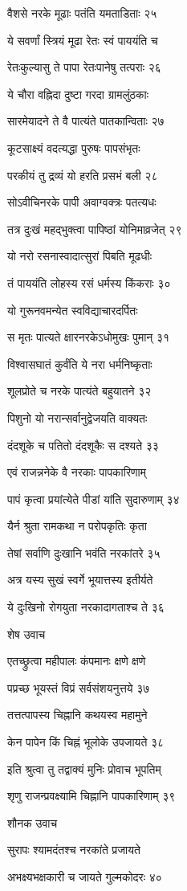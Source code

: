 वैशसे नरके मूढाः पतंति यमताडिताः २५

ये सवर्णां स्त्रियं मूढा रेतः स्वं पाययंति च

रेतःकुल्यासु ते पापा रेतःपानेषु तत्पराः २६

ये चौरा वह्निदा दुष्टा गरदा ग्रामलुंठकाः

सारमेयादने ते वै पात्यंते पातकान्विताः २७

कूटसाक्ष्यं वदत्यद्धा पुरुषः पापसंभृतः

परकीयं तु द्रव्यं यो हरति प्रसभं बली २८

सोऽवीचिनरके पापी अवाग्वक्त्रः पतत्यधः

तत्र दुःखं महद्भुक्त्वा पापिष्ठां योनिमाव्रजेत् २९

यो नरो रसनास्वादात्सुरां पिबति मूढधीः

तं पाययंति लोहस्य रसं धर्मस्य किंकराः ३०

यो गुरूनवमन्येत स्वविद्याचारदर्पितः

स मृतः पात्यते क्षारनरकेऽधोमुखः पुमान् ३१

विश्वासघातं कुर्वंति ये नरा धर्मनिष्कृताः

शूलप्रोते च नरके पात्यंते बहुयातने ३२

पिशुनो यो नरान्सर्वानुद्वेजयति वाक्यतः

दंदशूके च पतितो दंदशूकैः स दश्यते ३३

एवं राजन्ननेके वै नरकाः पापकारिणाम्

पापं कृत्वा प्रयांत्येते पीडां यांति सुदारुणाम् ३४

यैर्न श्रुता रामकथा न परोपकृतिः कृता

तेषां सर्वाणि दुःखानि भवंति नरकांतरे ३५

अत्र यस्य सुखं स्वर्गे भूयात्तस्य इतीर्यते

ये दुःखिनो रोगयुता नरकादागताश्च ते ३६

शेष उवाच

एतच्छ्रुत्वा महीपालः कंपमानः क्षणे क्षणे

पप्रच्छ भूयस्तं विप्रं सर्वसंशयनुत्तये ३७

तत्तत्पापस्य चिह्नानि कथयस्व महामुने

केन पापेन किं चिह्नं भूलोके उपजायते ३८

इति श्रुत्वा तु तद्वाक्यं मुनिः प्रोवाच भूपतिम्

शृणु राजन्प्रवक्ष्यामि चिह्नानि पापकारिणाम् ३९

शौनक उवाच

सुरापः श्यामदंतश्च नरकांते प्रजायते

अभक्ष्यभक्षकारी च जायते गुल्मकोदरः ४०

